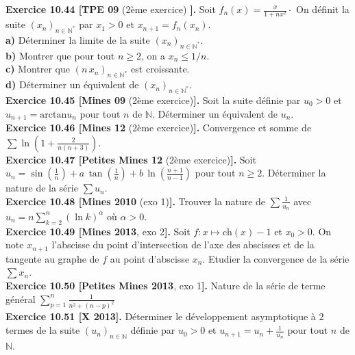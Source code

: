 \documentclass[a4paper,12pt,francais]{article}
\newcommand{\field}[1]{\mathbb{#1}}
\newcommand{\N}{\field{N}}
\newcommand{\ch}{\mbox{ch}}
\begin{document}
\noindent
{\bf Exercice 10.44 [TPE 09} (2ème exercice) {\bf].} Soit $f_n(x)=\frac{x}{1+nx^2} \cdot$ On définit la suite $(x_n)_{n \in \N^*}$ par $x_1>0$ et $x_{n+1}=f_n(x_n)$.\\
{\bf a)} Déterminer la limite de la suite $(x_n)_{n \in \N^*}$.\\
{\bf b)} Montrer que pour tout $n \geqslant 2$, on a $x_n \leqslant 1/n$.\\
{\bf c)} Montrer que $(n \, x_n)_{n \in \N^*}$ est croissante.\\
{\bf d)} Déterminer un équivalent de $(x_n)_{n \in \N^*}$.\\

\noindent
{\bf Exercice 10.45 [Mines 09} (2ème exercice){\bf ].}  
Soit la suite définie par $u_0>0$ et $u_{n+1}=\mbox{arctan} u_n$ pour tout $n$ de $\N$. Déterminer un équivalent de $u_n$.\\

\noindent
{\bf Exercice 10.46 [Mines 12} (2ème exercice){\bf ].} Convergence et somme de $\sum \ln \left({ 1+\frac{2}{n(n+3)} }\right)$.\\

\noindent
{\bf Exercice 10.47 [Petites Mines 12} (2ème exercice){\bf ].} Soit 
$u_n=\sin \left({\frac{1}{n}}\right) + a \, \tan \left( {\frac{1}{n}} \right) +b \, \ln \left({ \frac{n+1}{n-1} }\right)$ pour tout $n\geqslant 2$. Déterminer la nature de la série $\sum u_n$.\\

\noindent
{\bf Exercice 10.48 [Mines 2010} (exo 1){\bf ].} Trouver la nature de $\sum \frac{1}{u_n}$ avec $u_n=n \displaystyle \sum_{k=2}^n (\ln k)^\alpha$ où $\alpha>0$.\\

\noindent
{\bf Exercice 10.49 [Mines 2013}, exo 2{\bf].} Soit $f: x\mapsto \ch(x)-1$ et $x_0>0$. On note $x_{n+1}$ l'abscisse du point d'intersection de l'axe des abscisses et de la tangente au graphe de $f$ au point d'abscisse $x_n$. Etudier la convergence de la série $\sum x_n$.\\

\noindent
{\bf Exercice 10.50 [Petites Mines 2013}, exo 1{\bf].} Nature de la série de terme général $\displaystyle \sum_{p=1}^n \frac{1}{n^2+(n-p)^2}$\\

\noindent
{\bf Exercice 10.51 [X 2013].} Déterminer le développement asymptotique à $2$ termes de la suite $(u_n)_{n \in \N}$ définie par $u_0>0$ et $u_{n+1}=u_n+\frac{1}{u_n}$ pour tout $n$ de $\N$.\\
\end{document}
